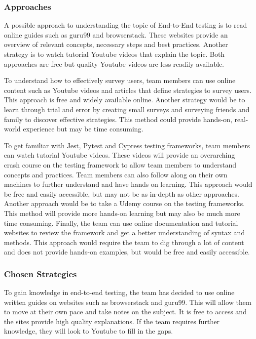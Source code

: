 \documentclass[12pt, titlepage]{article}
\begin{document}
\subsubsection*{Approaches}

A possible approach to understanding the topic of End-to-End testing is to read online guides such as guru99 and browserstack. These websites provide an overview of relevant concepts, necessary steps and best practices. Another strategy is to watch tutorial Youtube videos that explain the topic. Both approaches are free but quality Youtube videos are less readily available. 

To understand how to effectively survey users, team members can use online content such as Youtube videos and articles that define strategies to survey users. This approach is free and widely available online. Another strategy would be to learn through trial and error by creating small surveys and surveying friends and family to discover effective strategies. This method could provide hands-on, real-world experience but may be time consuming.

To get familiar with Jest, Pytest and Cypress testing frameworks, team members can watch tutorial Youtube videos. These videos will provide an overarching crash course on the testing framework to allow team members to understand concepts and practices. Team members can also follow along on their own machines to further understand and have hands on learning. This approach would be free and easily accessible, but may not be as in-depth as other approaches. Another approach would be to take a Udemy course on the testing frameworks. This method will provide more hands-on learning but may also be much more time consuming. Finally, the team can use online documentation and tutorial websites to review the framework and get a better understanding of syntax and methods. This approach would require the team to dig through a lot of content and does not provide hands-on examples, but would be free and easily accessible.

\subsubsection*{Chosen Strategies}

To gain knowledge in end-to-end testing, the team has decided to use online written guides on websites such as browserstack and guru99. This will allow them to move at their own pace and take notes on the subject. It is free to access and the sites provide high quality explanations. If the team requires further knowledge, they will look to Youtube to fill in the gaps.
\end{document}

